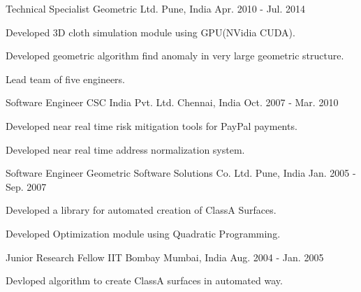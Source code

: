 \begin{cventries}
  \cventry
    {Technical Specialist} %
    {Geometric Ltd.} %
    {Pune, India} %
    {Apr. 2010 - Jul. 2014} %
    {
      \begin{cvitems} %
        \item {Developed 3D cloth simulation module using GPU(NVidia CUDA).}
        \item {Developed geometric algorithm find anomaly in very large geometric structure.}
        \item {Lead team of five engineers.}
      \end{cvitems}
    }

  \cventry
    {Software Engineer} %
    {CSC India Pvt. Ltd.} %
    {Chennai, India} %
    {Oct. 2007 - Mar. 2010} %
    {
      \begin{cvitems} %
        \item {Developed near real time risk mitigation tools for PayPal payments.}
        \item {Developed near real time address normalization system.}
      \end{cvitems}
    }

  \cventry
    {Software Engineer} %
    {Geometric Software Solutions Co. Ltd.} %
    {Pune, India} %
    {Jan. 2005 - Sep. 2007} %
    {
      \begin{cvitems} %
        \item {Developed a library for automated creation of ClassA Surfaces.}
        \item {Developed Optimization module using Quadratic Programming.} 
      \end{cvitems}
    }

  \cventry
    {Junior Research Fellow} %
    {IIT Bombay} %
    {Mumbai, India} %
    {Aug. 2004 - Jan. 2005} %
    {
      \begin{cvitems} %
        \item {Devloped algorithm to create ClassA surfaces in automated way.}
      \end{cvitems}
    }
\end{cventries}
